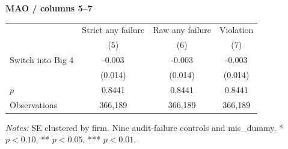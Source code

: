 \documentclass[10pt]{article}
\begin{document}
\medskip\textbf{MAO / columns 5--7}\par\smallskip
\begin{tabular*}{\textwidth}{@{\extracolsep{\fill}}lccc@{}}
\toprule
 & Strict any failure & Raw any failure & Violation \\
 & (5) & (6) & (7) \\
\midrule
Switch into Big 4 & -0.003 & -0.003 & -0.003 \\
 & (0.014) & (0.014) & (0.014) \\
$p$ & 0.8441 & 0.8441 & 0.8441 \\
Observations & 366,189 & 366,189 & 366,189 \\
\bottomrule\end{tabular*}\par
\medskip\fontsize{9}{11}\selectfont\textit{Notes:} SE clustered by firm. Nine audit-failure controls and mis\_dummy. * $p<0.10$, ** $p<0.05$, *** $p<0.01$.
\end{document}
